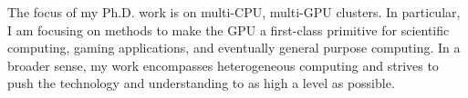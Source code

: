 The focus of my Ph.D. work is on multi-CPU, multi-GPU clusters. In  particular,
I am focusing on methods to make the GPU a first-class  primitive for scientific
computing, gaming applications, and eventually  general purpose computing. In a
broader sense, my work encompasses  heterogeneous computing and strives to push
the technology and  understanding to as high a level as possible.
